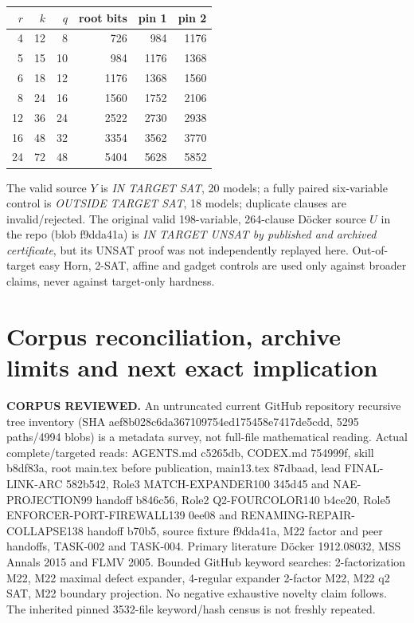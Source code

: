 \documentclass[11pt]{article}
\begin{document}
\begin{center}\begin{tabular}{rrrrrr}
\toprule $r$ & $k$ & $q$ & root bits & pin 1 & pin 2\\\midrule
4&12&8&726&984&1176\\
5&15&10&984&1176&1368\\
6&18&12&1176&1368&1560\\
8&24&16&1560&1752&2106\\
12&36&24&2522&2730&2938\\
16&48&32&3354&3562&3770\\
24&72&48&5404&5628&5852\\\bottomrule
\end{tabular}\end{center}

The valid source $Y$ is \emph{IN TARGET SAT}, 20 models; a fully paired six-variable control is \emph{OUTSIDE TARGET SAT}, 18 models; duplicate clauses are invalid/rejected. The original valid 198-variable, 264-clause D\"ocker source $U$ in the repo (blob f9dda41a) is \emph{IN TARGET UNSAT by published and archived certificate}, but its UNSAT proof was not independently replayed here. Out-of-target easy Horn, 2-SAT, affine and gadget controls are used only against broader claims, never against target-only hardness.

\section{Corpus reconciliation, archive limits and next exact implication}
\noindent\textbf{CORPUS REVIEWED.} An untruncated current GitHub repository recursive tree inventory (SHA aef8b028c6da367109754ed175458e7417de5cdd, 5295 paths/4994 blobs) is a metadata survey, not full-file mathematical reading. Actual complete/targeted reads: AGENTS.md c5265db, CODEX.md 754999f, skill b8df83a, root main.tex before publication, main13.tex 87dbaad, lead FINAL-LINK-ARC 582b542, Role3 MATCH-EXPANDER100 345d45 and NAE-PROJECTION99 handoff b846c56, Role2 Q2-FOURCOLOR140 b4ce20, Role5 ENFORCER-PORT-FIREWALL139 0ee08 and RENAMING-REPAIR-COLLAPSE138 handoff b70b5, source fixture f9dda41a, M22 factor and peer handoffs, TASK-002 and TASK-004. Primary literature Döcker 1912.08032, MSS Annals 2015 and FLMV 2005. Bounded GitHub keyword searches: 2-factorization M22, M22 maximal defect expander, 4-regular expander 2-factor M22, M22 q2 SAT, M22 boundary projection. No negative exhaustive novelty claim follows. The inherited pinned 3532-file keyword/hash census is not freshly repeated.
\end{document}
